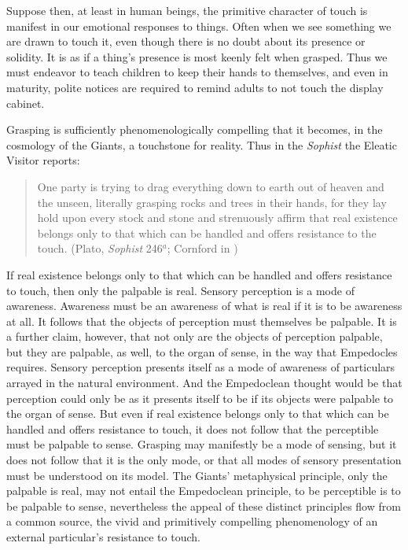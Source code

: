 Suppose then, at least in human beings, the primitive character of touch is manifest in our emotional responses to things. Often when we see something we are drawn to touch it, even though there is no doubt about its presence or solidity. It is as if a thing's presence is most keenly felt when grasped. Thus we must endeavor to teach children to keep their hands to themselves, and even in maturity, polite notices are required to remind adults to not touch the display cabinet. 

Grasping is sufficiently phenomenologically compelling that it becomes, in the cosmology of the Giants, a touchstone for reality. Thus in the \emph{Sophist} the Eleatic Visitor reports: 
\begin{quote}
    One party is trying to drag everything down to earth out of heaven and the unseen, literally grasping rocks and trees in their hands, for they lay hold upon every stock and stone and strenuously affirm that real existence belongs only to that which can be handled and offers resistance to the touch. (Plato, \emph{Sophist} 246\( ^{a} \); Cornford in \citealt[990]{Hamilton:1989fk})
\end{quote}
If real existence belongs only to that which can be handled and offers resistance to touch, then only the palpable is real. Sensory perception is a mode of awareness. Awareness must be an awareness of what is real if it is to be awareness at all. It follows that the objects of perception must themselves be palpable. It is a further claim, however, that not only are the objects of perception palpable, but they are palpable, as well, to the organ of sense, in the way that Empedocles requires. Sensory perception presents itself as a mode of awareness of particulars arrayed in the natural environment. And the Empedoclean thought would be that perception could only be as it presents itself to be if its objects were palpable to the organ of sense. But even if real existence belongs only to that which can be handled and offers resistance to touch, it does not follow that the perceptible must be palpable to sense. Grasping may manifestly be a mode of sensing, but it does not follow that it is the only mode, or that all modes of sensory presentation must be understood on its model. The Giants' metaphysical principle, only the palpable is real, may not entail the Empedoclean principle, to be perceptible is to be palpable to sense, nevertheless the appeal of these distinct principles flow from a common source, the vivid and primitively compelling phenomenology of an external particular's resistance to touch.

